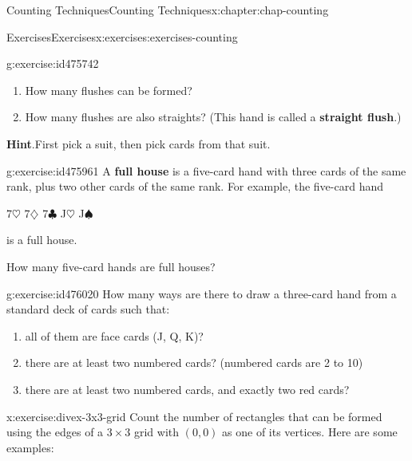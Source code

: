 \documentclass[oneside,10pt,]{book}
\newcommand{\blocktitlefont}{\relax}
\newcommand{\terminology}[1]{\textbf{#1}}
\numberwithin{equation}{section}
\begin{document}
\begin{chapterptx}{Counting Techniques}{}{Counting Techniques}{}{}{x:chapter:chap-counting}
\begin{exercises-section}{Exercises}{}{Exercises}{}{}{x:exercises:exercises-counting}
\begin{divisionexercise}{9}{}{}{g:exercise:id475742}
\begin{enumerate}[label=(\alph*)]
\item{}How many flushes can be formed?%
\item{}How many flushes are also straights? (This hand is called a \terminology{straight flush}.)%
\end{enumerate}
%
\par\smallskip%
\noindent\textbf{\blocktitlefont Hint}.\hypertarget{g:hint:id475910}{}\quad{}First pick a suit, then pick cards from that suit.%
\end{divisionexercise}%
\begin{divisionexercise}{10}{}{}{g:exercise:id475961}%
A \terminology{full house} is a five-card hand with three cards of the same rank, plus two other cards of the same rank. For example, the five-card hand%
\begin{sidebyside}{1}{0.3}{0.3}{0}%
\begin{sbspanel}{0.4}%
7\(\heartsuit\) 7\(\diamondsuit\) 7\(\clubsuit\) J\(\heartsuit\) J\(\spadesuit\)%
\end{sbspanel}%
\end{sidebyside}%
\par
is a full house.%
\par
How many five-card hands are full houses?%
\end{divisionexercise}%
\begin{divisionexercise}{11}{}{}{g:exercise:id476020}%
How many ways are there to draw a three-card hand from a standard deck of cards such that:%
\begin{enumerate}[label=(\alph*)]
\item{}all of them are face cards (J, Q, K)?%
\item{}there are at least two numbered cards? (numbered cards are 2 to 10)%
\item{}there are at least two numbered cards, and exactly two red cards?%
\end{enumerate}
%
\end{divisionexercise}%
\begin{divisionexercise}{12}{}{}{x:exercise:divex-3x3-grid}%
Count the number of rectangles that can be formed using the edges of a \(3 \times 3\) grid with \((0,0)\) as one of its vertices. Here are some examples:%
\begin{sidebyside}{3}{0.0916666666666667}{0.0916666666666667}{0.183333333333333}%
\begin{sbspanel}{0.15}%
\end{sbspanel}
\end{sidebyside}
\end{divisionexercise}
\end{exercises-section}
\end{chapterptx}
\end{document}
